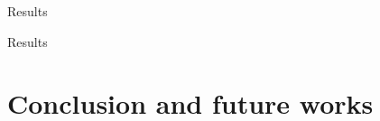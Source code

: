 \documentclass{beamer}
\begin{document}
\begin{frame}{Results}
    
\begin{figure}[htbp]
  \centering
  \caption{
         }
  \label{fig:retraction_plot3}
\end{figure}
\end{frame}


\begin{frame}{Results}
    \begin{figure}[h]
    \end{figure}
\end{frame}
\section{Conclusion and future works}
\end{document}
